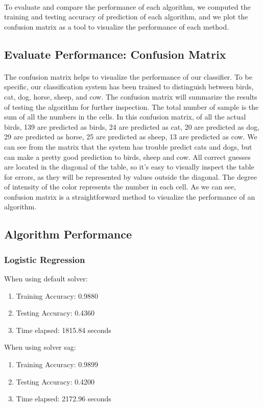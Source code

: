 \documentclass{article}
\begin{document}
\paragraph{}
To evaluate and compare the performance of each algorithm, we computed the training and testing accuracy of prediction of each algorithm, and we plot the confusion matrix as a tool to visualize the performance of each method.
\subsection{Evaluate Performance: Confusion Matrix}
\paragraph{}
The confusion matrix helps to visualize the performance of our classifier. To be specific, our classification system has been trained to distinguish between birds, cat, dog, horse, sheep, and cow. The confusion matrix will summarize the results of testing the algorithm for further inspection. The total number of sample is the sum of all the numbers in the cells. In this confusion matrix, of all the actual birds, 139 are predicted as birds, 24 are predicted as cat, 20 are predicted as dog, 29 are predicted as horse, 25 are predicted as sheep, 13 are predicted as cow. We can see from the matrix that the system has trouble predict cats and  dogs, but can make a pretty good prediction to birds, sheep and cow. All correct guesses are located in the diagonal of the table, so it's easy to visually inspect the table for errors, as they will be represented by values outside the diagonal. The degree of intensity of the color represents the number in each cell. As we can see, confusion matrix is a straightforward method to visualize the performance of an algorithm.

\subsection{Algorithm Performance}
\subsubsection{Logistic Regression}
When using default solver: 
\begin{enumerate}
\item Training Accuracy: 0.9880 
\item Testing Accuracy: 0.4360 
\item Time elapsed: 1815.84 seconds
\end{enumerate}
When using solver sag: 
\begin{enumerate}
\item Training Accuracy: 0.9899
\item Testing Accuracy: 0.4200
\item Time elapsed: 2172.96 seconds
\end{enumerate}
\end{document}
